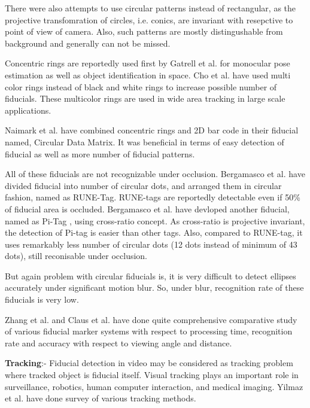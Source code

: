 \documentclass[runningheads]{llncs}
\begin{document}
There were also attempts to use circular patterns instead of rectangular, as
the projective transfomration of circles, i.e. conics, are invariant with
resepctive to point of view of camera\cite{runetag11}. Also, such patterns are
mostly distingushable from background and generally can not be missed.

Concentric rings are reportedly used first by Gatrell et al.\cite{concentric}
for monocular pose estimation as well as object identification in space. Cho et al.
\cite{Cho:2001}\cite{Cho97fastcolor} have used multi color rings instead of
black and white rings\cite{concentric} to increase possible number of fiducials.
These multicolor rings are used in wide area tracking in large scale
applications.

Naimark et al. \cite{NaimarkF02} have combined concentric rings and 2D bar code
in their fiducial named, Circular Data Matrix. It was beneficial in terms of
easy detection of fiducial as well as more number of fiducial patterns.

All of these fiducials are not recognizable under occlusion.
Bergamasco et al. \cite{runetag11} have divided fiducial into number of
circular dots, and arranged them in circular fashion, named as RUNE-Tag.
RUNE-tags are reportedly detectable even if 50\% of fiducial area is occluded.
Bergamasco et al. have devloped another fiducial, named as Pi-Tag
\cite{Pitag13}, using cross-ratio concept. As cross-ratio is projective
invariant, the detection of Pi-tag is easier than other tags. Also, compared
to RUNE-tag, it uses remarkably less number of circular dots (12 dots instead of
minimum of 43 dots), still reconisable under occlusion.

But again problem with circular fiducials is, it is very difficult to detect
ellipses accurately under significant motion blur. So, under blur, recognition
rate of these fiducials is very low.

Zhang et al.\cite{Zhang:2002} and Claus et al. \cite{ClausF04} have done
quite comprehensive comparative study of various fiducial marker systems with
respect to processing time, recognition rate and accuracy with
respect to viewing angle and distance.

\textbf{Tracking}:-
Fiducial detection in video may be considered as tracking problem where tracked
object is fiducial itself. Visual tracking plays an important role in
surveillance, robotics, human computer interaction, and medical
imaging\cite{Yilmaz:2006}. Yilmaz et al.\cite{Yilmaz:2006} have done survey of
various tracking methods. 
\end{document}
